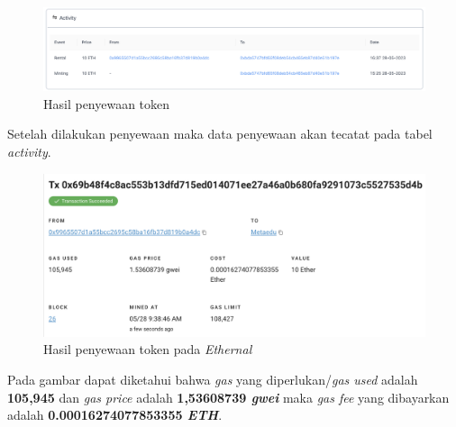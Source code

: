 \begin{itemize}
        \begin{figure} [H] \centering
          \includegraphics[scale=0.3]{gambar/img-test-share-rent-3.png}
          \caption{Hasil penyewaan token}
          \label{fig:TestShareResultRental}
        \end{figure}
        Setelah dilakukan penyewaan maka data penyewaan akan tecatat pada tabel \emph{activity}.
        \begin{figure} [H] \centering
          \includegraphics[scale=0.4]{gambar/img-test-share-rent-4.png}
          \caption{Hasil penyewaan token pada \emph{Ethernal}}
          \label{fig:TestRentResultRental2}
        \end{figure}
        Pada gambar dapat diketahui bahwa \emph{gas} yang diperlukan/\emph{gas used} adalah \textbf{105,945} dan \emph{gas price} adalah \textbf{1,53608739 \emph{gwei}} maka \emph{gas fee} yang dibayarkan adalah \textbf{0.00016274077853355 \emph{ETH}}.
        

\end{itemize}

